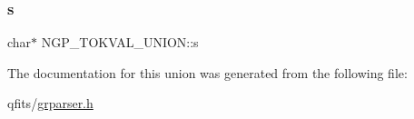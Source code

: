 \mbox{\label{union_n_g_p___t_o_k_v_a_l___u_n_i_o_n_a2fabf3d5e3f07bbe0843d1f55c2714fa}} 
\subsubsection{\texorpdfstring{s}{s}}
{\footnotesize\ttfamily char$\ast$ N\+G\+P\+\_\+\+T\+O\+K\+V\+A\+L\+\_\+\+U\+N\+I\+O\+N\+::s}



The documentation for this union was generated from the following file\+:\begin{DoxyCompactItemize}
\item 
qfits/\hyperlink{grparser_8h}{grparser.\+h}\end{DoxyCompactItemize}
